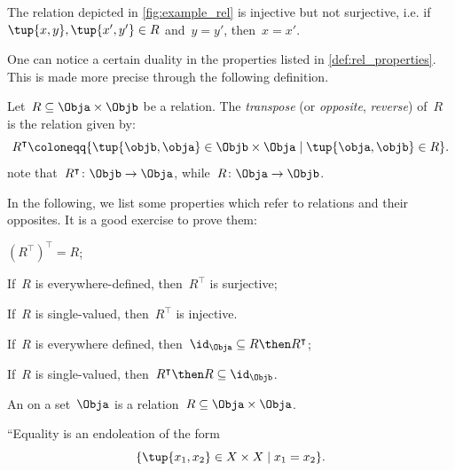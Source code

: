 \begin{example}
The relation depicted in \cref{fig:example_rel} is injective but not surjective, i.e. if~$\tup{x,y},\tup{x',y'}\in R$ and~$y=y'$, then~$x=x'$.
\end{example}

One can notice a certain duality in the properties listed in \cref{def:rel_properties}. This is made more precise through the following definition.

\begin{definition}
Let~$R\subseteq \Obja\times \Objb$ be a relation. The \emph{transpose} (or \emph{opposite}, \emph{reverse}) of~$R$ is the relation given by:
\begin{equation}
    R^\intercal \coloneqq \{\tup{\objb,\obja}\in \Objb\times \Obja \mid \tup{\obja,\objb}\in R \}.
\end{equation}
note that~$R^\intercal\colon \Objb\to \Obja$, while~$R\colon \Obja\to \Objb$.
\end{definition}
\begin{remark}
  In the following, we list some properties which refer to relations and their opposites. It is a good exercise to prove them:
  \begin{compactitem}
      \item $\left( R^\intercal\right)^\intercal =R$;
      \item If~$R$ is everywhere-defined, then~$R^\intercal$ is surjective;
      \item If~$R$ is single-valued, then~$R^\intercal$ is injective.
      \item If~$R$ is everywhere defined, then~$\id_\Obja\subseteq R\then R^\intercal$;
      \item If~$R$ is single-valued, then~$R^\intercal\then R\subseteq \id_\Objb$.
  \end{compactitem}
\end{remark}

\begin{definition}[Endorelation]
An \emph{} on a set~$\Obja$ is a relation~$R\subseteq \Obja\times \Obja$.
\end{definition}

\begin{example}
``Equality is an endoleation of the form
\begin{equation*}
    \{\tup{x_1,x_2}\in X\times X\mid x_1=x_2\}.
\end{equation*}
\end{example}

